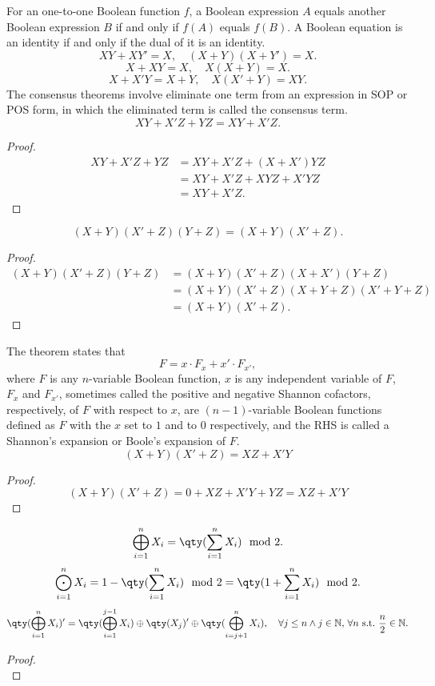 \documentclass[a4paper,12pt]{article}
\begin{document}
\begin{itemize}
\begin{itemize}
\begin{itemize}
\begin{itemize}
\begin{itemize}
\begin{itemize}
\begin{itemize}
\begin{itemize}
\begin{itemize}
For an one-to-one Boolean function $f$, a Boolean expression $A$ equals another Boolean expression $B$ if and only if $f(A)$ equals $f(B)$.
A Boolean equation is an identity if and only if the dual of it is an identity.
\[XY+XY'=X,\quad (X+Y)(X+Y')=X.\]
\[X+XY=X,\quad X(X+Y)=X.\]
\[X+X'Y=X+Y,\quad X(X'+Y)=XY.\]
The consensus theorems involve eliminate one term from an expression in SOP or POS form, in which the eliminated term is called the consensus term.
\[XY+X′Z+YZ=XY+X′Z.\]
\begin{proof}
\[\begin{aligned}
XY+X′Z+YZ&=XY+X'Z+(X+X')YZ\\
&=XY+X'Z+XYZ+X'YZ\\
&=XY+X′Z.
\end{aligned}\]
\end{proof}
\[(X+Y)(X′+Z)(Y+Z)=(X+Y)(X′+Z).\]
\begin{proof}
\[\begin{aligned}
(X+Y)(X′+Z)(Y+Z)&=(X+Y)(X'+Z)(X+X')(Y+Z)\\
&=(X+Y)(X'+Z)(X+Y+Z)(X'+Y+Z)\\
&=(X+Y)(X′+Z).
\end{aligned}\]
\end{proof}
The theorem states that
\[F=x\cdot F_x+x'\cdot F_{x'},\]
where $F$ is any $n$-variable Boolean function, $x$ is any independent variable of $F$, $F_x$ and $F_{x'}$, sometimes called the positive and negative Shannon cofactors, respectively, of $F$ with respect to $x$, are $(n-1)$-variable Boolean functions defined as $F$ with the $x$ set to $1$ and to $0$ respectively, and the RHS is called a Shannon's expansion or Boole's expansion of $F$.
\[(X+Y)(X'+Z)=XZ+X'Y\]
\begin{proof}
\[(X+Y)(X'+Z)=0+XZ+X'Y+YZ=XZ+X'Y\]
\end{proof}
\[\bigoplus_{i=1}^nX_i=\qty(\sum_{i=1}^nX_i)\mod 2.\]
\[\bigodot_{i=1}^nX_i=1-\qty(\sum_{i=1}^nX_i)\mod 2=\qty(1+\sum_{i=1}^nX_i)\mod 2.\]
\[\qty(\bigoplus_{i=1}^nX_i)'=\qty(\bigoplus_{i=1}^{j-1}X_i)\oplus\qty(X_j)'\oplus\qty(\bigoplus_{i=j+1}^nX_i),\quad\forall j\leq n\land j\in\mathbb{N},\,\forall n\text{\ s.t.\ }\frac{n}{2}\in\mathbb{N}.\]
\begin{proof}\mbox{}\\

\end{proof}
\end{itemize}
\end{itemize}
\end{itemize}
\end{itemize}
\end{itemize}
\end{itemize}
\end{itemize}
\end{itemize}
\end{itemize}
\end{document}
